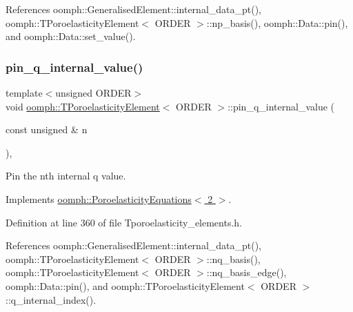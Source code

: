 References oomph\+::\+Generalised\+Element\+::internal\+\_\+data\+\_\+pt(), oomph\+::\+T\+Poroelasticity\+Element$<$ O\+R\+D\+E\+R $>$\+::np\+\_\+basis(), oomph\+::\+Data\+::pin(), and oomph\+::\+Data\+::set\+\_\+value().

\mbox{\label{classoomph_1_1TPoroelasticityElement_a47d4f048c1120647968b844927db7877}} 
\subsubsection{\texorpdfstring{pin\+\_\+q\+\_\+internal\+\_\+value()}{pin\_q\_internal\_value()}}
{\footnotesize\ttfamily template$<$unsigned O\+R\+D\+ER$>$ \\
void \hyperlink{classoomph_1_1TPoroelasticityElement}{oomph\+::\+T\+Poroelasticity\+Element}$<$ O\+R\+D\+ER $>$\+::pin\+\_\+q\+\_\+internal\+\_\+value (\begin{DoxyParamCaption}\item[{const unsigned \&}]{n }\end{DoxyParamCaption})\hspace{0.3cm}{\ttfamily [inline]}, {\ttfamily [virtual]}}



Pin the nth internal q value. 



Implements \hyperlink{classoomph_1_1PoroelasticityEquations_a25b900a66e8e31ec0e5f432fcdf115d5}{oomph\+::\+Poroelasticity\+Equations$<$ 2 $>$}.



Definition at line 360 of file Tporoelasticity\+\_\+elements.\+h.



References oomph\+::\+Generalised\+Element\+::internal\+\_\+data\+\_\+pt(), oomph\+::\+T\+Poroelasticity\+Element$<$ O\+R\+D\+E\+R $>$\+::nq\+\_\+basis(), oomph\+::\+T\+Poroelasticity\+Element$<$ O\+R\+D\+E\+R $>$\+::nq\+\_\+basis\+\_\+edge(), oomph\+::\+Data\+::pin(), and oomph\+::\+T\+Poroelasticity\+Element$<$ O\+R\+D\+E\+R $>$\+::q\+\_\+internal\+\_\+index().

\mbox{\label{classoomph_1_1TPoroelasticityElement_a009eca6ca9d19912f3523605190cccb5}} 
